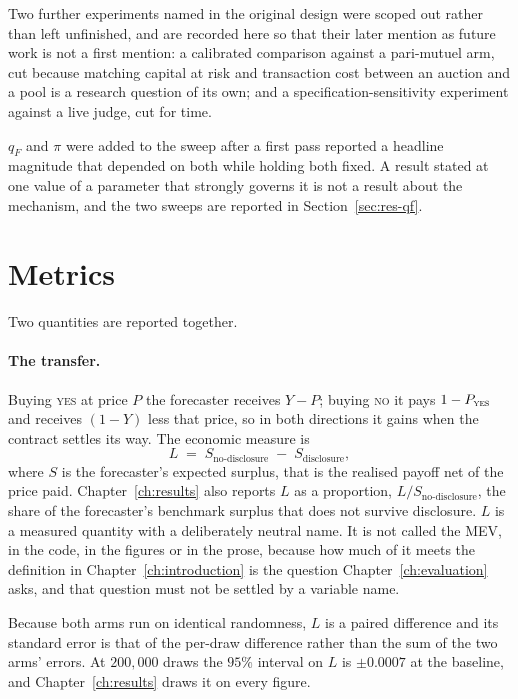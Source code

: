 Two further experiments named in the original design were scoped out rather than left
unfinished, and are recorded here so that their later mention as future work is not a first
mention: a calibrated comparison against a pari-mutuel arm, cut because matching capital at
risk and transaction cost between an auction and a pool is a research question of its own;
and a specification-sensitivity experiment against a live judge, cut for time.

$q_F$ and $\pi$ were added to the sweep after a first pass reported a headline magnitude
that depended on both while holding both fixed. A result stated at one value of a parameter
that strongly governs it is not a result about the mechanism, and the two sweeps are
reported in Section~\ref{sec:res-qf}.

\section{Metrics}
\label{sec:metrics}

Two quantities are reported together.

\paragraph{The transfer.} Buying \textsc{yes} at price $P$ the forecaster receives $Y - P$;
buying \textsc{no} it pays $1 - P_{\textsc{yes}}$ and receives $(1-Y)$ less that price, so in
both directions it gains when the contract settles its way. The economic measure is
\[
L \;=\; S_{\text{no-disclosure}} \;-\; S_{\text{disclosure}},
\]
where $S$ is the forecaster's expected surplus, that is the realised payoff net of the price
paid. Chapter~\ref{ch:results} also reports $L$ as a proportion,
$L / S_{\text{no-disclosure}}$, the share of the forecaster's benchmark surplus that does not
survive disclosure. $L$ is a measured quantity with a deliberately neutral name. It is not called the MEV,
in the code, in the figures or in the prose, because how much of it meets the definition in
Chapter~\ref{ch:introduction} is the question Chapter~\ref{ch:evaluation} asks, and that
question must not be settled by a variable name.

Because both arms run on identical randomness, $L$ is a paired difference and its standard
error is that of the per-draw difference rather than the sum of the two arms' errors. At
$200{,}000$ draws the $95\%$ interval on $L$ is $\pm 0.0007$ at the baseline, and
Chapter~\ref{ch:results} draws it on every figure.

